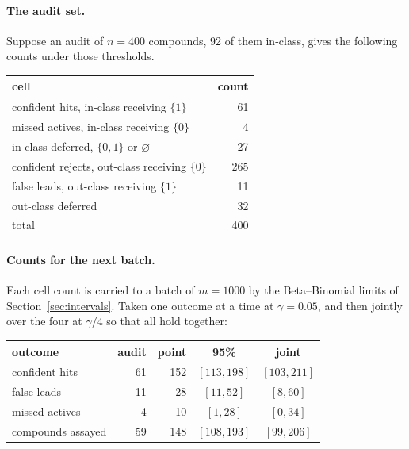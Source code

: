 \documentclass[10pt]{article}
\begin{document}
\paragraph{The audit set.} Suppose an audit of $n=400$ compounds, 92 of them in-class, gives
the following counts under those thresholds.

\begin{center}
\small
\begin{tabular}{@{}lr@{}}
\toprule
cell & count \\
\midrule
confident hits, in-class receiving $\{1\}$      &  61 \\
missed actives, in-class receiving $\{0\}$      &   4 \\
in-class deferred, $\{0,1\}$ or $\varnothing$   &  27 \\
confident rejects, out-class receiving $\{0\}$  & 265 \\
false leads, out-class receiving $\{1\}$        &  11 \\
out-class deferred                              &  32 \\
\midrule
total                                           & 400 \\
\bottomrule
\end{tabular}
\end{center}

\paragraph{Counts for the next batch.} Each cell count is carried to a batch of $m=1000$ by
the Beta--Binomial limits of Section~\ref{sec:intervals}. Taken one outcome at a time at
$\gamma=0.05$, and then jointly over the four at $\gamma/4$ so that all hold together:

\begin{center}
\small
\begin{tabular}{@{}lrrcc@{}}
\toprule
outcome & audit & point & 95\% & joint \\
\midrule
confident hits    & 61 & 152 & $[113,198]$ & $[103,211]$ \\
false leads       & 11 &  28 & $[11,52]$   & $[8,60]$ \\
missed actives    &  4 &  10 & $[1,28]$    & $[0,34]$ \\
compounds assayed & 59 & 148 & $[108,193]$ & $[99,206]$ \\
\bottomrule
\end{tabular}
\end{center}
\end{document}
